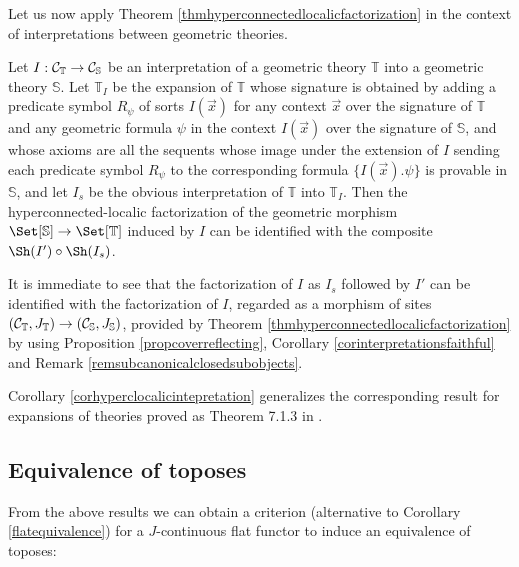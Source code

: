 \documentclass[a4paper,12pt]{article}
\begin{document}
Let us now apply Theorem \ref{thmhyperconnectedlocalicfactorization} in the context of interpretations between geometric theories.

\begin{corollary}\label{corhyperclocalicintepretation}
	Let $I:{\cal C}_{\mathbb T}\to {\cal C}_{\mathbb S}$ be an interpretation of a geometric theory $\mathbb T$ into a geometric theory ${\mathbb S}$. Let ${\mathbb T}_{I}$ be the expansion of $\mathbb T$ whose signature is obtained by adding a predicate symbol $R_{\psi}$ of sorts $I(\vec{x})$ for any context $\vec{x}$ over the signature of $\mathbb T$ and any geometric formula $\psi$ in the context $I(\vec{x})$ over the signature of $\mathbb S$, and whose axioms are all the sequents whose image under the extension of $I$ sending each predicate symbol $R_{\psi}$ to the corresponding formula $\{I(\vec{x}). \psi\}$ is provable in $\mathbb S$, and let $I_{s}$ be the obvious interpretation of $\mathbb T$ into ${\mathbb T}_{I}$.
	Then the hyperconnected-localic factorization of the geometric morphism $\Set[{\mathbb S}]\to \Set[{\mathbb T}]$ induced by $I$ can be identified with the composite $\Sh(I')\circ \Sh(I_{s})$.
\end{corollary}
	
\begin{proofs}
	It is immediate to see that the factorization of $I$ as $I_{s}$ followed by $I'$ can be identified with the factorization of $I$, regarded as a morphism of sites $({\cal C}_{\mathbb T}, J_{\mathbb T})\to ({\cal C}_{\mathbb S}, J_{\mathbb S})$, provided by Theorem \ref{thmhyperconnectedlocalicfactorization} by using Proposition \ref{propcoverreflecting}, Corollary \ref{corinterpretationsfaithful} and Remark \ref{remsubcanonicalclosedsubobjects}.  
\end{proofs}		

\begin{remark}
	Corollary \ref{corhyperclocalicintepretation} generalizes the corresponding result for expansions of theories proved as Theorem 7.1.3 in \cite{OCBook}.
\end{remark}

\subsection{Equivalence of toposes}\label{sec:equivalencetoposes2}

From the above results we can obtain a criterion (alternative to Corollary \ref{flatequivalence}) for a $J$-continuous flat functor to induce an equivalence of toposes:
\end{document}
